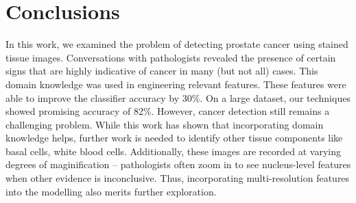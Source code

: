\section{Conclusions}
\label{sec:conclusions}

In this work, we examined the problem of detecting prostate cancer using stained tissue images. Conversations with pathologists revealed the presence of certain signs that are highly indicative of cancer in many (but not all) cases. This domain knowledge was used in engineering relevant features. These features were able to improve the classifier accuracy by 30\%. On a large dataset, our techniques showed promising accuracy of 82\%. However, cancer detection still remains a challenging problem. While this work has shown that incorporating domain knowledge helps, further work is needed to identify other tissue components like basal cells, white blood cells. Additionally, these images are recorded at varying degrees of maginification -- pathologists often zoom in to see nucleus-level features when other evidence is inconclusive. Thus, incorporating multi-resolution features into the modelling also merits further exploration.
